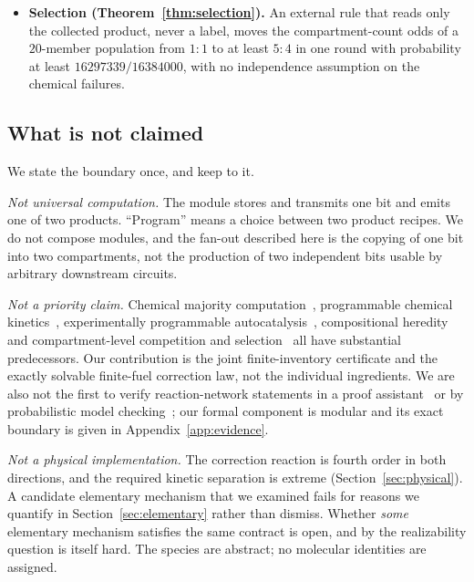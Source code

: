 \documentclass[11pt,a4paper]{article}
\theoremstyle{plain}
\theoremstyle{definition}
\theoremstyle{remark}
\begin{document}
\begin{itemize}[leftmargin=1.2em]
{  Corollary~\ref{cor:nokernel}).} A specified mixed preparation yields a productive
  \emph{opposite}-program daughter pair with probability $>0.0074$. A pure newborn yields
  one with probability at most $8.1\cdot 10^{-6}$, because on a pure face with no waste
  the majority channels are both disabled and the only minority-creating channel is
  first-order leakage. The two classes differ by a factor above $935$, so no two-state
  mutation matrix indexed by the label alone is consistent with the source.
\item \textbf{Selection (Theorem~\ref{thm:selection}).} An external rule that reads only
  the collected product, never a label, moves the compartment-count odds of a $20$-member
  population from $1:1$ to at least $5:4$ in one round with probability at least
  $16297339/16384000$, with no independence assumption on the chemical failures.
\end{itemize}

\subsection{What is not claimed}\label{sec:notclaimed}

We state the boundary once, and keep to it.

\emph{Not universal computation.} The module stores and transmits one bit and emits one
of two products. ``Program'' means a choice between two product recipes. We do not
compose modules, and the fan-out described here is the copying of one bit into two
compartments, not the production of two independent bits usable by arbitrary downstream
circuits.

\emph{Not a priority claim.} Chemical majority computation~\citep{angluin2008,%
cardelli2012,condon2020}, programmable chemical kinetics~\citep{soloveichik2010,qian2011,%
chen2013}, experimentally programmable autocatalysis~\citep{kriukov2024}, compositional
heredity~\citep{segre2000,matsubara2026} and compartment-level competition and
selection~\citep{matsumura2016,lu2024} all have substantial predecessors. Our
contribution is the joint finite-inventory certificate and the exactly solvable
finite-fuel correction law, not the individual ingredients. We are also not the first to
verify reaction-network statements in a proof assistant~\citep{lathrop2024,ripple2026} or
by probabilistic model checking~\citep{lakin2012,kwiatkowska2011}; our formal component is
modular and its exact boundary is given in Appendix~\ref{app:evidence}.

\emph{Not a physical implementation.} The correction reaction is fourth order in both
directions, and the required kinetic separation is extreme (Section~\ref{sec:physical}).
A candidate elementary mechanism that we examined fails for reasons we quantify in
Section~\ref{sec:elementary} rather than dismiss. Whether \emph{some} elementary
mechanism satisfies the same contract is open, and by \citet{phan2026} the realizability
question is itself hard. The species are abstract; no molecular identities are assigned.
\end{document}
